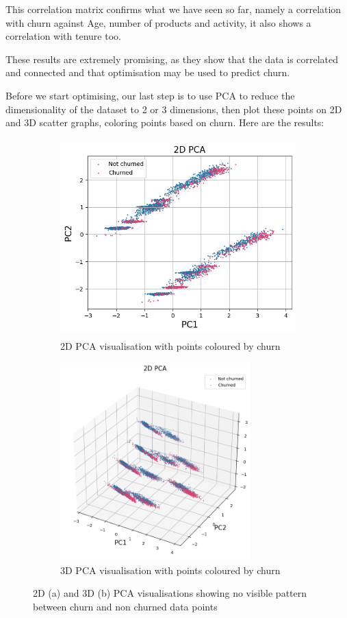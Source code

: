 \documentclass[]{article}
\begin{document}
This correlation matrix confirms what we have seen so far, namely a correlation with churn against Age, number of products and activity, it also shows a correlation with tenure too.

These results are extremely promising, as they show that the data is correlated and connected and that optimisation may be used to predict churn.

Before we start optimising, our last step is to use PCA to reduce the dimensionality of the dataset to 2 or 3 dimensions, then plot these points on 2D and 3D scatter graphs, coloring points based on churn. Here are the results:

\begin{figure}[h!]
	\centering
	\begin{subfigure}[t]{0.55\textwidth}
		\centering
		\includegraphics[height=3in]{2d}
		\caption{2D PCA visualisation with points coloured by churn}
	\end{subfigure}
	\begin{subfigure}[t]{0.55\textwidth}
		\centering
		\includegraphics[height=3in]{3d}
		\caption{3D PCA visualisation with points coloured by churn}
	\end{subfigure}
	\caption{2D (a) and 3D (b) PCA visualisations showing no visible pattern between churn and non churned data points}
\end{figure}
\end{document}
